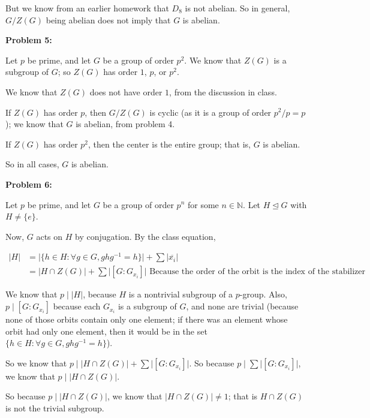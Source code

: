\documentclass[a4paper,12pt]{article}
\newcommand{\tab}{\hspace{4mm}} %
\newcommand{\shunt}{\vspace{20mm}}
\newcommand{\absval}[1]{\lvert #1 \rvert}
\newcommand{\N}{\mathbb{N}}
\newcommand{\subgp}{\mathrel{\unlhd}}
\begin{document}
\tab But we know from an earlier homework that $D_8$ is not abelian. So in general, $G/Z(G)$ being abelian does not imply that $G$ is abelian.

\shunt

{\bf Problem 5:}

Let $p$ be prime, and let $G$ be a group of order $p^2$. We know that $Z(G)$ is a subgroup of $G$; so $Z(G)$ has order $1$, $p$, or $p^2$.

We know that $Z(G)$ does not have order $1$, from the discussion in class.

If $Z(G)$ has order $p$, then $G/Z(G)$ is cyclic (as it is a group of order $p^2/p = p$); we know that $G$ is abelian, from problem 4. 

If $Z(G)$ has order $p^2$, then the center is the entire group; that is, $G$ is abelian.

So in all cases, $G$ is abelian.

\shunt

{\bf Problem 6:}

Let $p$ be prime, and let $G$ be a group of order $p^n$ for some $n \in \N$. Let $H \subgp G$ with $H \neq \{e\}$.

Now, $G$ acts on $H$ by conjugation. By the class equation,

\begin{align*}
\absval{H} &= \absval{\{h \in H: \forall g \in G, ghg^{-1} = h\}} + \sum\absval{\overline{x_i}} \\
&=\absval{H \cap Z(G)} + \sum\absval{[G:G_{x_i}]} \text{ Because the order of the orbit is the index of the stabilizer}
\end{align*}

We know that $p \mid \absval{H}$, because $H$ is a nontrivial subgroup of a $p$-group. Also, $p \mid [G:G_{x_i}]$ because each $G_{x_i}$ is a subgroup of $G$, and none are trivial (because none of those orbits contain only one element; if there was an element whose orbit had only one element, then it would be in the set $\{h \in H: \forall g \in G, ghg^{-1} = h\}$).

So we know that $p \mid \absval{H \cap Z(G)} + \sum\absval{[G:G_{x_i}]}$. So because $p \mid \sum\absval{[G:G_{x_i}]}$, we know that $p \mid \absval{H \cap Z(G)}$.

So because $p \mid \absval{H \cap Z(G)}$, we know that $\absval{H \cap Z(G)} \neq 1$; that is $H \cap Z(G)$ is not the trivial subgroup.

\shunt
\end{document}
